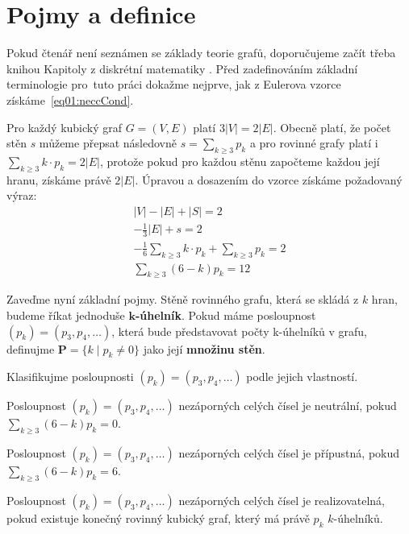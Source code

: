 
\chapter{Pojmy a definice}

Pokud čtenář není seznámen se základy teorie grafů, doporučujeme začít třeba knihou Kapitoly z diskrétní matematiky \cite{Matousek}. Před zadefinováním základní terminologie pro~tuto práci dokažme nejprve, jak z Eulerova vzorce získáme~\eqref{eq01:neccCond}. 

\begin{dukaz}
Pro každý kubický graf $G = (V,E)$ platí $3 |V| = 2 |E|$. Obecně platí, že počet stěn $s$ můžeme přepsat následovně $s = \sum_{k \geq 3}{p_k}$ a pro rovinné grafy platí i~$ \sum_{k \geq 3}{k \cdot p_k}= 2|E|$, protože pokud pro každou stěnu započteme každou její hranu, získáme právě $2|E|$. Úpravou a dosazením do vzorce získáme požadovaný výraz: 
\begin{align*}
|V|-|E|+|S|=2 \\ -\frac{1}{3} |E| + s = 2 \\
-\frac{1}{6} \sum_{k \geq 3}{k \cdot p_k} + \sum_{k \geq 3}{p_k} = 2 \\ 
\sum_{k \geq 3}{(6-k)p_k}=12
\end{align*}
\end{dukaz}

Zaveďme nyní základní pojmy. Stěně rovinného grafu, která se skládá z $k$ hran, budeme říkat jednoduše \textbf{$\boldsymbol{k}$-úhelník}. Pokud máme posloupnost $(p_k) = (p_3,p_4,\dots)$, která bude představovat počty k-úhelníků v grafu, definujme $\boldsymbol{P} = \lbrace k \mid p_k \neq 0 \rbrace$ jako její \textbf{množinu stěn}.

Klasifikujme posloupnosti $(p_k) = (p_3,p_4,\dots)$ podle jejich vlastností.

\begin{definice}\label{def01:neutralni}
Posloupnost $(p_k) = (p_3,p_4,\dots)$ nezáporných celých čísel je neutrální, pokud $\sum_{k \geq 3}{(6-k)p_k}=0$.
\end{definice}

\begin{definice}\label{def01:pripustna}
Posloupnost $(p_k) = (p_3,p_4,\dots)$ nezáporných celých čísel je přípustná, pokud $\sum_{k \geq 3}{(6-k)p_k}=6$.
\end{definice}

\begin{definice}\label{def01:realizovatelna}
Posloupnost $(p_k) = (p_3,p_4,\dots)$ nezáporných celých čísel je realizovatelná, pokud existuje konečný rovinný kubický graf, který má právě $p_k$ $k$-úhelníků.
\end{definice}

